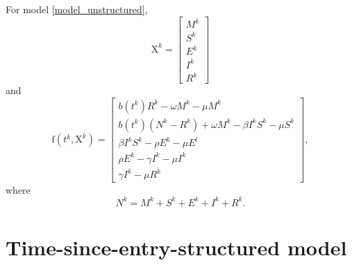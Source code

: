 \documentclass{jpmarticle}
\renewcommand{\vec}[1]{\boldsymbol{\mathrm{#1}}}
\begin{document}
For model \eqref{model_unstructured},
\begin{equation}
  \vec{X}^k =
  \begin{bmatrix}
    M^k \\ S^k \\ E^k \\ I^k \\ R^k
  \end{bmatrix}
\end{equation}
and
\begin{equation}
  \vec{f}\left(t^k, \vec{X}^k\right) =
  \begin{bmatrix}
    b\left(t^k\right) R^k
    - \omega M^k
    - \mu M^k
    \\
    b\left(t^k\right) \left(N^k - R^k\right)
    + \omega M^k
    - \beta I^k S^k
    - \mu S^k
    \\
    \beta I^k S^k
    - \rho E^k
    - \mu E^l
    \\
    \rho E^k
    - \gamma I^k
    - \mu I^k
    \\
    \gamma I^k
    - \mu R^k
  \end{bmatrix},
\end{equation}
where
\begin{equation}
  \label{eq:1}
  N^k = M^k + S^k + E^k + I^k + R^k.
\end{equation}


\section{Time-since-entry-structured model}
\end{document}
